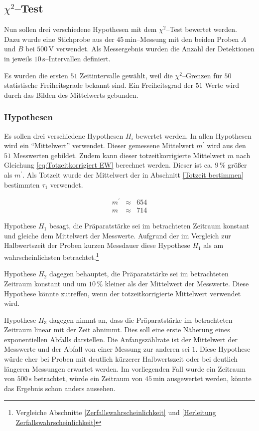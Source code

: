 \documentclass[12pt,a4paper]{scrartcl}
\numberwithin{equation}{section} %
\begin{document}
\hypertarget{chi2test}{\subsection{$\chi^2$--Test}\label{chi2test}}

Nun sollen drei verschiedene Hypothesen mit dem $\chi^2$--Test bewertet werden. Dazu wurde eine Stichprobe aus der $45\mathrm{\,min}$--Messung mit den beiden Proben $A$ und $B$ bei $500\mathrm{\,V}$ verwendet. Als Messergebnis wurden die Anzahl der Detektionen in jeweils $10\mathrm{\,s}$--Intervallen definiert.

Es wurden die ersten $51$ Zeitintervalle gewählt, weil die $\chi^2$--Grenzen für $50$ statistische Freiheitsgrade bekannt sind. \cite{Kapur} Ein Freiheitsgrad der $51$ Werte wird durch das Bilden des Mittelwerts gebunden.

\subsubsection{Hypothesen}
\label{Hypothesen}
Es sollen drei verschiedene Hypothesen $H_i$ bewertet werden. In allen Hypothesen wird ein ``Mittelwert'' verwendet. Dieser gemessene Mittelwert $m^\prime$ wird aus den $51$ Messwerten gebildet. Zudem kann dieser totzeitkorrigierte Mittelwert $m$ nach Gleichung \ref{eq:Totzeitkorrigiert EW} berechnet werden. Dieser ist ca. $9\,\%$ größer als $m^\prime$. Als Totzeit wurde der Mittelwert der in Abschnitt \ref{Totzeit bestimmen} bestimmten $\tau_1$ verwendet.

\begin{eqnarray}
	m^\prime &\approx& 654 \\
	m &\approx& 714
\end{eqnarray}

Hypothese $H_1$ besagt, die Präparatstärke sei im betrachteten Zeitraum konstant und gleiche dem Mittelwert der Messwerte. Aufgrund der im Vergleich zur Halbwertszeit der Proben kurzen Messdauer diese Hypothese $H_1$ als am wahrscheinlichsten betrachtet.\footnote{Vergleiche Abschnitte \ref{Zerfallswahrscheinlichkeit} und \ref{Herleitung Zerfallswahrscheinlichkeit}}

Hypothese $H_2$ dagegen behauptet, die Präparatstärke sei im betrachteten Zeitraum konstant und um $10\,\%$ kleiner als der Mittelwert der Messwerte. Diese Hypothese könnte zutreffen, wenn der totzeitkorrigierte Mittelwert verwendet wird.

Hypothese $H_3$ dagegen nimmt an, dass die Präparatstärke im betrachteten Zeitraum linear mit der Zeit abnimmt. Dies soll eine erste Näherung eines exponentiellen Abfalls darstellen. Die Anfangszählrate ist der Mittelwert der Messwerte und der Abfall von einer Messung zur anderen sei $1$. Diese Hypothese würde eher bei Proben mit deutlich kürzerer Halbwertszeit oder bei deutlich längeren Messungen erwartet werden. Im vorliegenden Fall wurde ein Zeitraum von $500\mathrm{\,s}$ betrachtet, würde ein Zeitraum von $45\mathrm{\,min}$ ausgewertet werden, könnte das Ergebnis schon anders aussehen.
\end{document}
